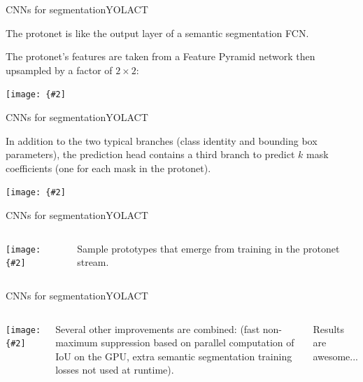 \documentclass[aspectratio=169]{beamer}
\newcommand{\myfig}[3]{\centerline{\texttt{[image: \{\#2]}}}
\begin{document}
\begin{frame}{CNNs for segmentation}{YOLACT}

  \medskip

  The protonet is like the output layer of a semantic segmentation FCN.

  \medskip

  The protonet's features are taken from a Feature Pyramid network then
  upsampled by a factor of $2\times 2$:

  \medskip
  
  \myfig{3in}{bolya-fig3}{Bolya, Zhou, Xiao, and Lee (2019), Fig.\ 3}

\end{frame}


\begin{frame}{CNNs for segmentation}{YOLACT}

  In addition to the two typical branches (class identity and
  bounding box parameters), the prediction head contains a third
  branch to predict $k$ mask coefficients (one for each mask in the
  protonet).

  \medskip
  
  \myfig{3in}{bolya-fig4}{Bolya, Zhou, Xiao, and Lee (2019), Fig.\ 4}

\end{frame}


\begin{frame}{CNNs for segmentation}{YOLACT}

  \begin{columns}

    \column{2.3in}
    
    \myfig{2.2in}{bolya-fig5}{Bolya, Zhou, Xiao, and Lee (2019), Fig.\ 5}

    \column{2.7in}

    Sample prototypes that emerge from training in the protonet stream.

  \end{columns}
  
\end{frame}


\begin{frame}{CNNs for segmentation}{YOLACT}

  \begin{columns}

    \column{3.8in}
    
    \myfig{3.6in}{bolya-fig6}{Bolya, Zhou, Xiao, and Lee (2019), Fig.\ 6}

    \column{1.2in}

    Several other improvements are combined: (fast non-maximum suppression
    based on parallel computation of IoU on the GPU, extra semantic segmentation
    training losses not used at runtime).

    \medskip

    Results are awesome...

  \end{columns}
    
\end{frame}
\end{document}
